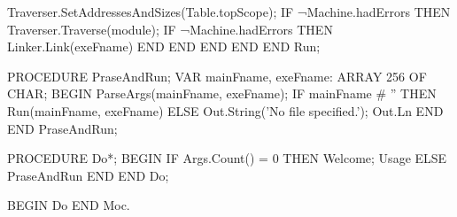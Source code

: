 \documentclass[utf8]{lgu}
\begin{document}
\begin{modula2long}
      Traverser.SetAddressesAndSizes(Table.topScope);
      IF ¬Machine.hadErrors THEN
        Traverser.Traverse(module);
        IF ¬Machine.hadErrors THEN
          Linker.Link(exeFname)
        END
      END
    END
  END
END Run;

PROCEDURE PraseAndRun;
VAR
  mainFname, exeFname: ARRAY 256 OF CHAR;
BEGIN
  ParseArgs(mainFname, exeFname);
  IF mainFname # '' THEN
    Run(mainFname, exeFname)
  ELSE
    Out.String('No file specified.'); Out.Ln
  END
END PraseAndRun;

PROCEDURE Do*;
BEGIN
  IF Args.Count() = 0 THEN
    Welcome;
    Usage
  ELSE
    PraseAndRun
  END
END Do;

BEGIN
  Do
END Moc.
\end{modula2long}


\end{document}
